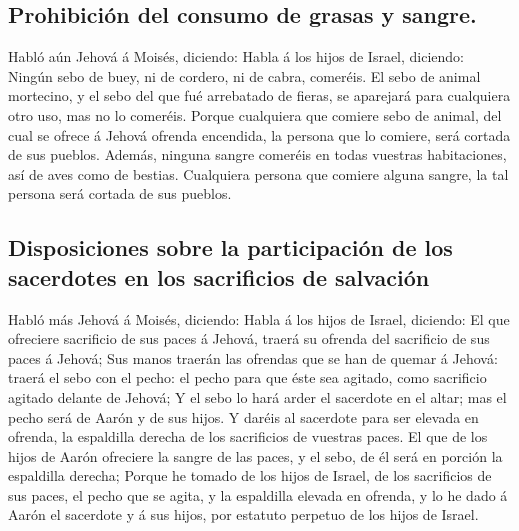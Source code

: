 \hypertarget{prohibiciuxf3n-del-consumo-de-grasas-y-sangre.}{%
\subsection{Prohibición del consumo de grasas y
sangre.}\label{prohibiciuxf3n-del-consumo-de-grasas-y-sangre.}}

 Habló aún Jehová á Moisés, diciendo:  Habla á
los hijos de Israel, diciendo: Ningún sebo de buey, ni de cordero, ni de
cabra, comeréis.  El sebo de animal mortecino, y el sebo
del que fué arrebatado de fieras, se aparejará para cualquiera otro uso,
mas no lo comeréis.  Porque cualquiera que comiere sebo de
animal, del cual se ofrece á Jehová ofrenda encendida, la persona que lo
comiere, será cortada de sus pueblos.  Además, ninguna
sangre comeréis en todas vuestras habitaciones, así de aves como de
bestias.  Cualquiera persona que comiere alguna sangre, la
tal persona será cortada de sus pueblos.

\hypertarget{disposiciones-sobre-la-participaciuxf3n-de-los-sacerdotes-en-los-sacrificios-de-salvaciuxf3n}{%
\subsection{Disposiciones sobre la participación de los sacerdotes en
los sacrificios de
salvación}\label{disposiciones-sobre-la-participaciuxf3n-de-los-sacerdotes-en-los-sacrificios-de-salvaciuxf3n}}

 Habló más Jehová á Moisés, diciendo:  Habla á
los hijos de Israel, diciendo: El que ofreciere sacrificio de sus paces
á Jehová, traerá su ofrenda del sacrificio de sus paces á Jehová;
 Sus manos traerán las ofrendas que se han de quemar á
Jehová: traerá el sebo con el pecho: el pecho para que éste sea agitado,
como sacrificio agitado delante de Jehová;  Y el sebo lo
hará arder el sacerdote en el altar; mas el pecho será de Aarón y de sus
hijos.  Y daréis al sacerdote para ser elevada en ofrenda,
la espaldilla derecha de los sacrificios de vuestras paces.
 El que de los hijos de Aarón ofreciere la sangre de las
paces, y el sebo, de él será en porción la espaldilla derecha;
 Porque he tomado de los hijos de Israel, de los
sacrificios de sus paces, el pecho que se agita, y la espaldilla elevada
en ofrenda, y lo he dado á Aarón el sacerdote y á sus hijos, por
estatuto perpetuo de los hijos de Israel.

